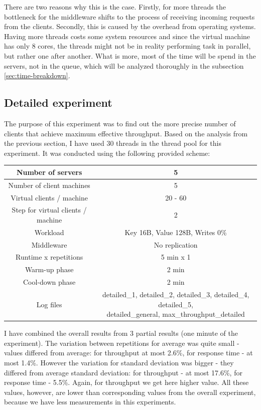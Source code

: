 \documentclass[11pt]{article}
\begin{document}
There are two reasons why this is the case. Firstly, for more threads the bottleneck for the middleware shifts to the process of receiving incoming requests from the clients.  Secondly, this is caused by %
the overhead from operating systems. Having more threads costs some system resources and since the virtual machine has only 8 cores, the threads might not be in reality performing task in parallel, but rather one after another. What is more, most of the time will be spend in the servers, not in the queue, which will be analyzed thoroughly in the subsection \ref{sec:time-breakdown}.

\subsection{Detailed experiment}

The purpose of this experiment was to find out the more precise number of clients that achieve maximum effective throughput. Based on the analysis from the previous section, I have used 30 threads in the thread pool for this experiment. It was conducted using the following provided scheme:
\medskip

\small{
\smallskip
\begin{tabular}{|c|c|}
\hline Number of servers & 5 \\ 
\hline Number of client machines & 5 \\ 
\hline Virtual clients / machine &  20 - 60 \\ 
\hline Step for virtual clients / machine & 2 \\
\hline Workload & Key 16B, Value 128B, Writes 0\% \\
\hline Middleware & No replication \\ 
\hline Runtime x repetitions & 5 min x 1 \\ 
\hline Warm-up phase & 2 min \\
\hline Cool-down phase & 2 min \\
\hline Log files & \parbox[t]{9cm}{detailed\_1, detailed\_2, detailed\_3, detailed\_4, detailed\_5, \\ detailed\_general, max\_throughput\_detailed} \\[3.4ex]
\hline 
\end{tabular} }
\medskip

I have combined the overall results from 3 partial results (one minute of the experiment). The variation between repetitions for average was quite small - values differed from average: for throughput at most 2.6\%, for response time - at most 1.4\%. However the variation for standard deviation was bigger - they differed from average standard deviation: for throughput - at most 17.6\%, for response time - 5.5\%. Again, for throughput we get here higher value. All these values, however, are lower than corresponding values from the overall experiment, because we have less measurements in this experiments.
\end{document}
